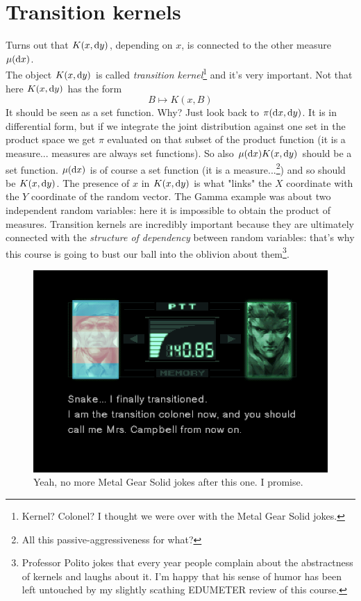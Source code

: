\documentclass{report}
\begin{document}
\section{Transition kernels}
Turns out that $K(x,\mathop{}\!\mathrm{d} y)$, depending on $x$, is connected to the other measure $\mu(\mathop{}\!\mathrm{d} x)$. \\
The object $K(x,\mathop{}\!\mathrm{d} y)$ is called \emph{transition kernel}\footnote{Kernel? Colonel? I thought we were over with the Metal Gear Solid jokes.} and it's very important. Not that here 
$K(x,\mathop{}\!\mathrm{d} y)$ has the form 	
\[B\mapsto K(x,B)\]
It should be seen as a set function. Why? Just look back to $\pi(\mathop{}\!\mathrm{d} x,\mathop{}\!\mathrm{d} y)$. It is in differential form, but if we integrate the joint distribution against one set in the product space we get $\pi$ evaluated on that subset of the product function (it is a measure... measures are always set functions). So also $\mu(\mathop{}\!\mathrm{d} x)K(x,\mathop{}\!\mathrm{d} y)$ should be a set function. $\mu(\mathop{}\!\mathrm{d} x)$ is of course a set function (it is a measure...\footnote{All this passive-aggressiveness for what?}) and so should be $K(x,\mathop{}\!\mathrm{d} y)$. The presence of $x$ in $K(x,\mathop{}\!\mathrm{d} y)$ is what "links" the $X$ coordinate with the $Y$ coordinate of the random vector.
The Gamma example was about two independent random variables: here it is impossible to obtain the product of measures. Transition kernels are incredibly important because they are ultimately connected with the \textit{structure of dependency} between random variables: that's why this course is going to bust our ball into the oblivion about them\footnote{Professor Polito jokes that every year people complain about the abstractness of kernels and laughs about it. I'm happy that his sense of humor has been left untouched by my slightly scathing EDUMETER review of this course.}.
\begin{figure}[H]
	\centering
	\includegraphics[width=0.57\linewidth]{codec}
	\caption[Colonel Campbell embraces her true self]{Yeah, no more Metal Gear Solid jokes after this one. I promise\protect\footnotemark.}
	\label{fig:codec}
\end{figure}
\end{document}
